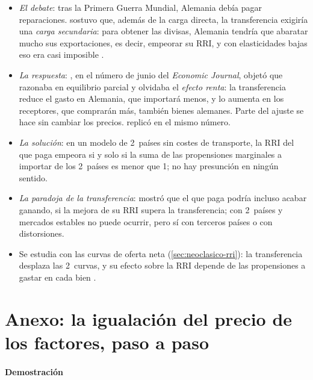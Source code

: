 \documentclass[11pt]{article}
\begin{document}
\begin{itemize}
\item \emph{El debate}: tras la Primera Guerra Mundial, Alemania debía pagar reparaciones. \textcite{Keynes1929German} sostuvo que, además de la carga directa, la transferencia exigiría una \emph{carga secundaria}: para obtener las divisas, Alemania tendría que abaratar mucho sus exportaciones, es decir, empeorar su RRI, y con elasticidades bajas eso era casi imposible .
\item \emph{La respuesta}: \textcite{Ohlin1929Reparation}, en el número de junio del \emph{Economic Journal}, objetó que  razonaba en equilibrio parcial y olvidaba el \emph{efecto renta}: la transferencia reduce el gasto en Alemania, que importará menos, y lo aumenta en los receptores, que comprarán más, también bienes alemanes. Parte del ajuste se hace sin cambiar los precios.  replicó en el mismo número\nocite{Keynes1929Reply}.
\item \emph{La solución}: en un modelo de 2~países sin costes de transporte, la RRI del que paga empeora si y solo si la suma de las propensiones marginales a importar de los 2~países es menor que 1; no hay presunción en ningún sentido\nocite{Samuelson1952Transfer,Samuelson1954Transfer}.
\item \emph{La paradoja de la transferencia}: \textcite{Leontief1936Note} mostró que el que paga podría incluso acabar ganando, si la mejora de su RRI supera la transferencia; con 2~países y mercados estables no puede ocurrir, pero sí con terceros países o con distorsiones.
\item Se estudia con las curvas de oferta neta (\ref{sec:neoclasico-rri}): la transferencia desplaza las 2~curvas, y su efecto sobre la RRI depende de las propensiones a gastar en cada bien .
\end{itemize}

\section{Anexo: la igualación del precio de los factores, paso a paso}\label{anexo:igualacion}

\paragraph{Demostración}
\end{document}
